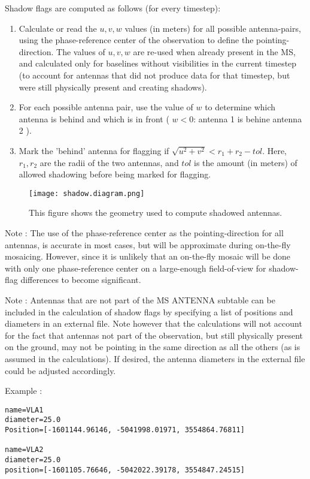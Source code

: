 Shadow flags are computed as follows (for every timestep): 
\begin{enumerate}
\item Calculate or read the $u,v,w$ values (in meters) for all possible antenna-pairs, 
using the phase-reference center of the observation to define the pointing-direction. 
The values of $u,v,w$ are re-used when already present in the MS, and calculated only for
baselines without visibilities in the current timestep (to account for antennas that did not produce
data for that timestep, but were still physically present and creating shadows).

\item For each possible antenna pair, use the value of $w$ to determine which antenna is behind and
which is in front ( $w<0$: antenna 1 is behine antenna 2 ).  

\item Mark the 'behind' antenna for flagging
if $\sqrt{u^2+v^2} < r_1 + r_2 - tol$. Here,  $r_1,r_2$ are the radii of the two antennas, and $tol$ is
the amount (in meters) of allowed shadowing before being marked for flagging. 
\end{enumerate}


\begin{figure}
\texttt{[image: shadow.diagram.png]}
\caption{This figure shows the geometry used to compute shadowed antennas.}
\end{figure}



Note : The use of the phase-reference center as the pointing-direction for all antennas, is accurate in most 
cases, but will be approximate during on-the-fly mosaicing. However, since it is unlikely that an 
on-the-fly mosaic will be done with only one phase-reference center on a large-enough field-of-view
for shadow-flag differences to become significant.  


Note : Antennas that are not part of the MS ANTENNA subtable can be included in the calculation of
shadow flags by specifying a list of positions and diameters in an external file.   Note however that
the calculations will not account for the fact that antennas not part of
the observation, but still physically present on the ground, may not be pointing in the same direction as all the others
(as is assumed in the calculations).  If desired, the antenna diameters in the external file could
be adjusted accordingly.

Example : 
\begin{verbatim}
name=VLA1
diameter=25.0
Position=[-1601144.96146, -5041998.01971, 3554864.76811]

name=VLA2
diameter=25.0
position=[-1601105.76646, -5042022.39178, 3554847.24515]
\end{verbatim}

